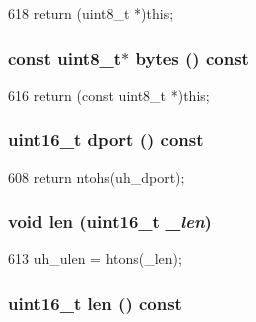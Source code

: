 \begin{DoxyCode}
618 { return (uint8_t *)this; }
\end{DoxyCode}
\hypertarget{structNet_1_1UdpHdr_aaa586eeaf354005403ca8e20f961b6c3}{
\subsubsection[{bytes}]{\setlength{\rightskip}{0pt plus 5cm}const uint8\_\-t$\ast$ bytes () const}}
\label{structNet_1_1UdpHdr_aaa586eeaf354005403ca8e20f961b6c3}



\begin{DoxyCode}
616 { return (const uint8_t *)this; }
\end{DoxyCode}
\hypertarget{structNet_1_1UdpHdr_aba1e568ee57bc49dc901f0beb54a62af}{
\subsubsection[{dport}]{\setlength{\rightskip}{0pt plus 5cm}uint16\_\-t dport () const}}
\label{structNet_1_1UdpHdr_aba1e568ee57bc49dc901f0beb54a62af}



\begin{DoxyCode}
608 { return ntohs(uh_dport); }
\end{DoxyCode}
\hypertarget{structNet_1_1UdpHdr_a6d227a891dced5a88df38f29d545e8aa}{
\subsubsection[{len}]{\setlength{\rightskip}{0pt plus 5cm}void len (uint16\_\-t {\em \_\-len})}}
\label{structNet_1_1UdpHdr_a6d227a891dced5a88df38f29d545e8aa}



\begin{DoxyCode}
613 { uh_ulen = htons(_len); }
\end{DoxyCode}
\hypertarget{structNet_1_1UdpHdr_aca537e1680645b058d622981e2fb1c13}{
\subsubsection[{len}]{\setlength{\rightskip}{0pt plus 5cm}uint16\_\-t len () const}}
\label{structNet_1_1UdpHdr_aca537e1680645b058d622981e2fb1c13}



